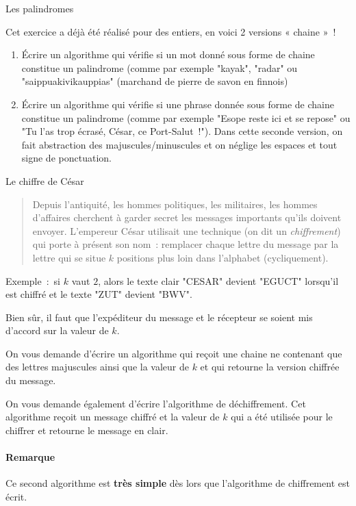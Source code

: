 \begin{Exercice}{Les palindromes}

	Cet exercice a déjà été réalisé pour des entiers, 
	en voici 2 versions « chaine »~! 
	
	\begin{enumerate}[label=\alph*)]
	
		\item Écrire un algorithme qui vérifie si un mot donné sous forme de
			chaine constitue un palindrome (comme par exemple "kayak", "radar"
			ou "saippuakivikauppias" (marchand de pierre de savon en finnois)
		
		\item Écrire un algorithme qui vérifie si une phrase donnée sous forme
			de chaine constitue un palindrome (comme par exemple "Esope reste
			ici et se repose" ou "Tu l’as trop écrasé, César, ce
			Port-Salut~!").  Dans cette seconde version, on fait abstraction
			des majuscules/minuscules et on néglige les espaces et tout signe
			de ponctuation.

	\end{enumerate}

\end{Exercice}

\begin{Exercice}{Le chiffre de César}
	\label{ex:cesar}

	\begin{quote}
	
		Depuis l’antiquité, les hommes politiques, les militaires, les hommes
		d’affaires cherchent à garder secret les messages importants qu’ils
		doivent envoyer.  L’empereur César utilisait une technique (on dit un
		\emph{chiffrement}) qui porte à présent son nom~: remplacer chaque
		lettre du message par la lettre qui se situe $k$ positions plus loin
		dans l’alphabet (cycliquement).
	
	\end{quote}

	Exemple~:~si $k$ vaut $2$, 
	alors le texte clair "CESAR" devient "EGUCT" lorsqu’il est chiffré 
	et le texte "ZUT" devient "BWV".

	Bien sûr, il faut que l’expéditeur du message et le récepteur
	se soient mis d’accord sur la valeur de $k$.

	On vous demande d’écrire un algorithme qui reçoit une chaine ne contenant
	que des lettres majuscules ainsi que la valeur de $k$ et qui retourne
	la version chiffrée du message.

	On vous demande également d’écrire l’algorithme de déchiffrement.
	Cet algorithme reçoit un message chiffré et la valeur de $k$ qui a été
	utilisée pour le chiffrer et retourne le message en clair.
	
	\paragraph{Remarque} Ce second algorithme est \textbf{très simple} dès lors
	que l'algorithme de chiffrement est écrit.

\end{Exercice}

